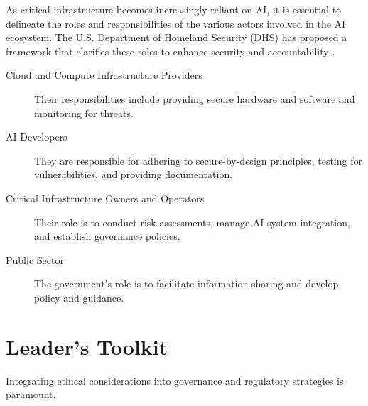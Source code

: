 As critical infrastructure becomes increasingly reliant on AI, it is essential to delineate the roles and responsibilities of the various actors involved in the AI ecosystem. The U.S. Department of Homeland Security (DHS) has proposed a framework that clarifies these roles to enhance security and accountability \parencite{DHS2024AIActors}.

\begin{description}
    \item[Cloud and Compute Infrastructure Providers] Their responsibilities include providing secure hardware and software and monitoring for threats.
    \item[AI Developers] They are responsible for adhering to secure-by-design principles, testing for vulnerabilities, and providing documentation.
    \item[Critical Infrastructure Owners and Operators] Their role is to conduct risk assessments, manage AI system integration, and establish governance policies.
    \item[Public Sector] The government's role is to facilitate information sharing and develop policy and guidance.
\end{description}

\section{Leader's Toolkit}
\label{sec:governance_leaders_toolkit}

Integrating ethical considerations into governance and regulatory strategies is paramount.
